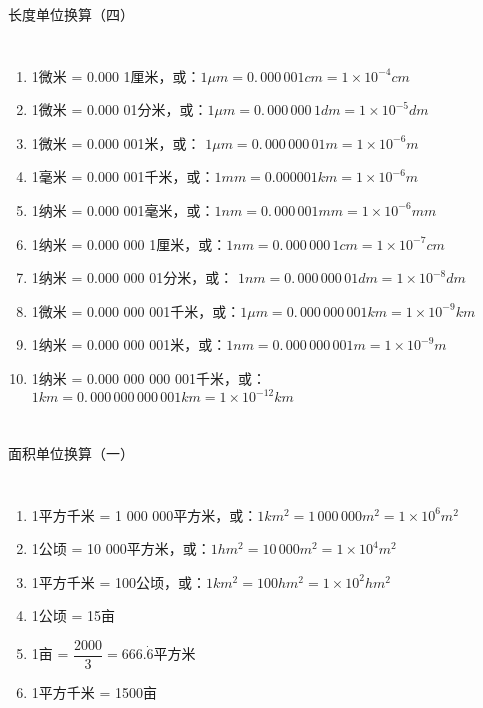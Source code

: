 \documentclass[aspectratio=169]{ctexbeamer} %
\begin{document}
\begin{frame}[t]{长度单位换算（四）}
\begin{columns}
\begin{enumerate}[label={\Alph*.}]
\item 1微米 = 0.000 1厘米，或：$1 \mu m = 0. \, 000 \, 001 cm = 1 \times 10^{-4} cm$ \pause
\item 1微米 = 0.000 01分米，或：$1 \mu m = 0. \, 000 \, 000 \, 1 dm = 1 \times 10^{-5} dm$ \pause
\item 1微米 = 0.000 001米，或： $1 \mu m = 0. \, 000 \, 000 \, 01 m = 1 \times 10^{-6} m$ \pause
\item 1毫米 = 0.000 001千米，或：$1 mm = 0.000 001 km = 1 \times 10^{-6} m$ \pause
\item 1纳米 = 0.000 001毫米，或：$1 nm = 0. \, 000 \, 001 mm = 1 \times 10^{-6} mm$ \pause
\item 1纳米 = 0.000 000 1厘米，或：$1 nm = 0. \, 000 \, 000 \, 1 cm = 1 \times 10^{-7} cm$ \pause
\item 1纳米 = 0.000 000 01分米，或： $1 nm = 0. \, 000 \, 000 \, 01 dm = 1 \times 10^{-8} dm$ \pause
\item 1微米 = 0.000 000 001千米，或：$1 \mu m = 0. \, 000 \, 000 \, 001 km = 1 \times 10^{-9} km$ \pause
\item 1纳米 = 0.000 000 001米，或：$1 nm = 0. \, 000 \, 000 \, 001 m = 1 \times 10^{-9} m$ \pause
\item 1纳米 = 0.000 000 000 001千米，或：$1km = 0. \, 000 \, 000 \, 000 \, 001 km = 1 \times 10^{-12} km$ \pause
\end{enumerate}
\end{columns}
\end{frame}

\begin{frame}[t]{面积单位换算（一）}
\begin{columns}
\begin{enumerate}[label={\Alph*.}]
\item 1平方千米 = 1 000 000平方米，或：$1km^2 = 1 \, 000 \, 000m^2 = 1×10^6 m^2$ \pause
\item 1公顷 = 10 000平方米，或：$1hm^2 = 10\,000m^2 = 1×10^4 m^2$ \pause
\item 1平方千米 = 100公顷，或：$1km^2 = 100hm^2 = 1×10^2 hm^2$ \pause
\item 1公顷 = 15亩 \pause
\item 1亩 = $\dfrac{2000}{3} = 666.\dot{6}$平方米 \pause
\item 1平方千米 = 1500亩 \pause
\end{enumerate}
\end{columns}
\end{frame}
\end{document}

